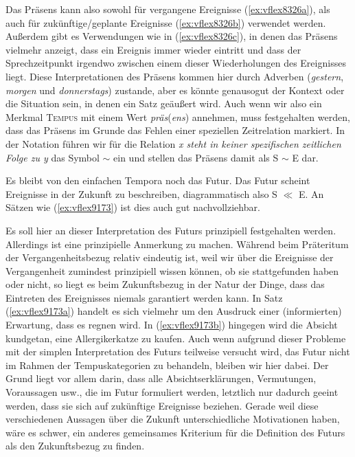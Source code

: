 Das Präsens kann also sowohl für vergangene Ereignisse (\ref{ex:vflex8326a}), als auch für zukünftige\slash geplante Ereignisse (\ref{ex:vflex8326b}) verwendet werden.
Außerdem gibt es Verwendungen wie in (\ref{ex:vflex8326c}), in denen das Präsens vielmehr anzeigt, dass ein Ereignis immer wieder eintritt und dass der Sprechzeitpunkt irgendwo zwischen einem dieser Wiederholungen des Ereignisses liegt.
Diese Interpretationen des Präsens kommen hier durch Adverben (\textit{gestern}, \textit{morgen} und \textit{donnerstags}) zustande, aber es könnte genausogut der Kontext oder die Situation sein, in denen ein Satz geäußert wird.
Auch wenn wir also ein Merkmal \textsc{Tempus} mit einem Wert \textit{präs}(\textit{ens}) annehmen, muss festgehalten werden, dass das Präsens im Grunde das Fehlen einer speziellen Zeitrelation markiert.
In der Notation führen wir für die Relation \textit{x steht in keiner spezifischen zeitlichen Folge zu y} das Symbol $\sim$ ein und stellen das Präsens damit als S $\sim$ E dar.


Es bleibt von den einfachen Tempora noch das Futur.
Das Futur scheint Ereignisse in der Zukunft zu beschreiben, diagrammatisch also S $\ll$ E.
An Sätzen wie (\ref{ex:vflex9173}) ist dies auch gut nachvollziehbar.

\begin{exe}
  \ex\label{ex:vflex9173}
  \begin{xlist}
  \end{xlist}
\end{exe}

Es soll hier an dieser Interpretation des Futurs prinzipiell festgehalten werden.
Allerdings ist eine prinzipielle Anmerkung zu machen.
Während beim Präteritum der Vergangenheitsbezug relativ eindeutig ist, weil wir über die Ereignisse der Vergangenheit zumindest prinzipiell wissen können, ob sie stattgefunden haben oder nicht, so liegt es beim Zukunftsbezug in der Natur der Dinge, dass das Eintreten des Ereignisses niemals garantiert werden kann.
In Satz (\ref{ex:vflex9173a}) handelt es sich vielmehr um den Ausdruck einer (informierten) Erwartung, dass es regnen wird.
In (\ref{ex:vflex9173b}) hingegen wird die Absicht kundgetan, eine Allergikerkatze zu kaufen.
Auch wenn aufgrund dieser Probleme mit der simplen Interpretation des Futurs teilweise versucht wird, das Futur nicht im Rahmen der Tempuskategorien zu behandeln, bleiben wir hier dabei.
Der Grund liegt vor allem darin, dass alle Absichtserklärungen, Vermutungen, Voraussagen usw., die im Futur formuliert werden, letztlich nur dadurch geeint werden, dass sie sich auf zukünftige Ereignisse beziehen.
Gerade weil diese verschiedenen Aussagen über die Zukunft unterschiedliche Motivationen haben, wäre es schwer, ein anderes gemeinsames Kriterium für die Definition des Futurs als den Zukunftsbezug zu finden.

